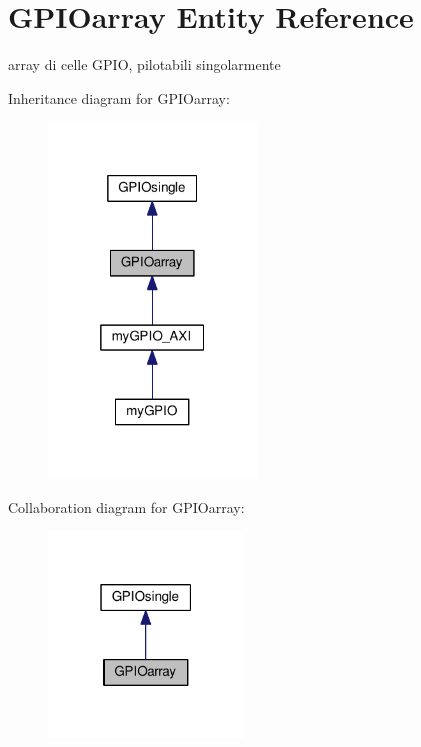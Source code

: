 \hypertarget{class_g_p_i_oarray}{\section{G\+P\+I\+Oarray Entity Reference}
\label{class_g_p_i_oarray}
}


array di celle G\+P\+I\+O, pilotabili singolarmente  




Inheritance diagram for G\+P\+I\+Oarray\+:
\nopagebreak
\begin{figure}[H]
\begin{center}
\leavevmode
\includegraphics[width=157pt]{class_g_p_i_oarray__inherit__graph}
\end{center}
\end{figure}


Collaboration diagram for G\+P\+I\+Oarray\+:
\nopagebreak
\begin{figure}[H]
\begin{center}
\leavevmode
\includegraphics[width=147pt]{class_g_p_i_oarray__coll__graph}
\end{center}
\end{figure}
